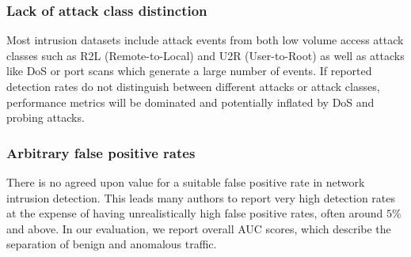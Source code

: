 \subsubsection{Lack of attack class distinction}

Most intrusion datasets include attack events from both low volume access attack classes such as R2L (Remote-to-Local) and U2R (User-to-Root) as well as attacks like DoS or port scans which generate a large number of events. %
If reported detection rates do not distinguish between different attacks or attack classes, performance metrics will be dominated and potentially inflated by DoS and probing attacks. %



\subsubsection{Arbitrary false positive rates}\label{SecF:ArbFP}
There is no agreed upon value for a suitable false positive rate in network intrusion detection. This leads many authors to report very high detection rates at the expense of having unrealistically high false positive rates, often around $5\%$ and above. %
In our evaluation, %
we report overall AUC scores, which describe the separation of benign and anomalous traffic.

